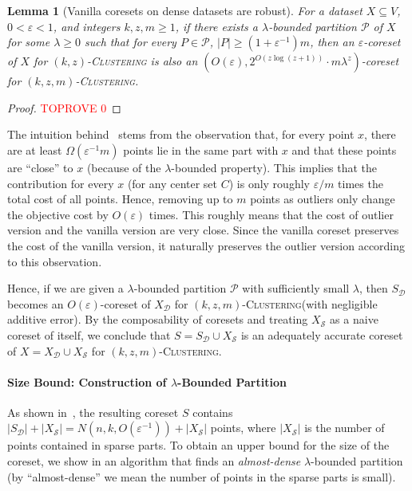 \documentclass[letterpaper,11pt]{article}
\theoremstyle{plain}
\newtheorem{lemma}[theorem]{Lemma}
\theoremstyle{definition}
\theoremstyle{remark}
\newcommand{\eps}{\varepsilon}
\renewcommand{\epsilon}{\varepsilon}
\newcommand{\calD}{\mathcal{D}}
\newcommand{\calP}{\mathcal{P}}
\newcommand{\calS}{\mathcal{S}}
\newcommand{\ProblemName}[1]{\textsc{#1}}
\newcommand{\kzC}{\ProblemName{$(k,z)$-Clustering}\xspace}
\newcommand{\kzmC}{\ProblemName{$(k,z,m)$-Clustering}\xspace}
\begin{document}
\begin{lemma}[Vanilla coresets on dense datasets are robust]
    \label{thm:main1}
For a dataset $X\subseteq V$, $0<\eps<1$, and integers $k,z,m\ge 1$, if there exists a $\lambda$-bounded partition $\calP$ of $X$ for some $\lambda\ge 0$ such that for every $P\in\calP$, $|P|\ge (1+\eps^{-1})m$, then an $\eps$-coreset of $X$ for \kzC
    is also an $\left(O(\eps), 2^{O(z\log(z+1))}\cdot m\lambda^z \right)$-coreset for \kzmC.
\end{lemma}
\begin{proof}\textcolor{red}{TOPROVE 0}\end{proof}
The intuition behind~ stems from the observation that,
for every point $x$, there are at least $\Omega(\epsilon^{-1}m)$ points
lie in the same part with $x$ and that these points are ``close'' to $x$ (because of the $\lambda$-bounded property). This implies that the contribution for every $x$ (for any center set $C$) is only roughly $\epsilon / m$ times the total cost of all points.
Hence, removing up to $m$ points as outliers only change the objective cost 
by $O(\epsilon)$ times.
This roughly means that the cost of outlier version and the vanilla version are very close. Since the vanilla coreset preserves the cost of the vanilla version, it naturally preserves the outlier version according to this observation.

Hence, if we are given a $\lambda$-bounded partition $\calP$ with sufficiently small $\lambda$, then $S_{\calD}$ becomes an $O(\eps)$-coreset of $X_{\calD}$ for \kzmC (with negligible additive error). By the composability of coresets and treating $X_{\calS}$ as a naive coreset of itself, we conclude that $S = S_{\calD}\cup X_{\calS}$ is an adequately accurate coreset of $X = X_{\calD}\cup X_{\calS}$ for \kzmC.

\paragraph{Size Bound: Construction of $\lambda$-Bounded Partition}
As shown in~, the resulting coreset $S$ contains $|S_{\calD}| + |X_{\calS}| = N(n,k,O(\eps^{-1})) + |X_{\calS}|$ points, where $|X_{\calS}|$ is the number of points contained in sparse parts. 
To obtain an upper bound for the size of the coreset, we show in  an algorithm that finds an \emph{almost-dense} $\lambda$-bounded partition (by ``almost-dense'' we mean the number of points in the sparse parts is small).
\end{document}
